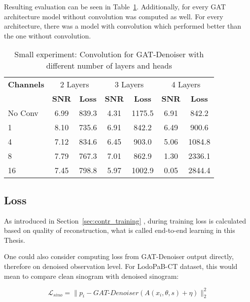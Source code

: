 Resulting evaluation can be seen in Table~\ref{tab:small_convolution_2}.
Additionally, for every GAT architecture model without convolution was computed as well.
For every architecture, there was a model with convolution which performed better than the one without convolution.


\begin{table}[H]
  \centering
  \begin{tabular}{l|cc|cc|cc}
    \toprule
    \textbf{Channels } & \multicolumn{2}{c|}{2 Layers} & \multicolumn{2}{c|}{3 Layers} & \multicolumn{2}{c}{4 Layers}  \\
                       & \textbf{SNR} & \textbf{Loss} & \textbf{SNR} & \textbf{Loss} & \textbf{SNR} & \textbf{Loss} \\ 
    \midrule
		No Conv & 6.99  & 839.3 & 4.31   & 1175.5 & 6.91 & 842.2     \\ \hline
		1       & 8.10  & 735.6 & 6.91   & 842.2 & 6.49 & 900.6     \\ \hline
		4       & 7.12  & 834.6 & 6.45   & 903.0 & 5.06 & 1084.8   \\ \hline
		8       & 7.79  & 767.3 & 7.01   & 862.9 & 1.30 & 2336.1    \\ \hline
		16      & 7.45  & 798.8 & 5.97   & 1002.9 & 0.05  & 2844.4   \\
    \midrule
  \end{tabular}

  \caption{Small experiment: Convolution for GAT-Denoiser with different number of layers and heads}
  \label{tab:small_convolution_2}
\end{table}



\subsection{Loss}
As introduced in Section~\ref{sec:contr_training} \textit{},
during training loss is calculated based on quality of reconstruction, what is called
end-to-end learning in this Thesis.

One could also consider computing loss from GAT-Denoiser output directly, therefore on denoised observation level.
For LodoPaB-CT dataset, this would mean to compare clean sinogram with denoised sinogram:

\begin{equation}
  \label{eq:loss_sino}
  \mathcal{L}_{sino} = \parallel p_i - \textit{GAT-Denoiser}(A(x_i, \theta, s) + \eta) \parallel ^2_2
\end{equation}

